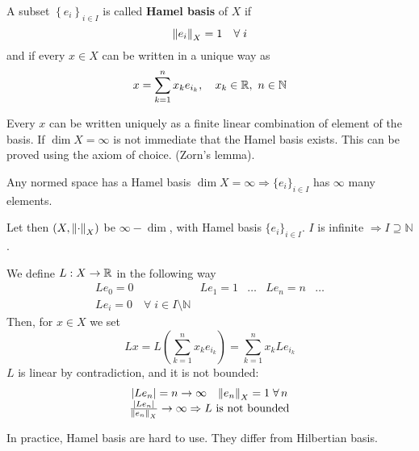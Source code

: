 \begin{definition}
    A subset \(\left\{ e_i \right\}_{i \in I}\) is called \textbf{Hamel basis} of \(X\) if 
    \[
        \norm{e_i}_X = 1 \quad \forall  \; i
    \]
    and if every \(x \in X\) can be written in a unique way as 
    \[
        x = \sum_{k=1}^n x_k e_{i_k}, \quad x_k \in \mathbb{R}, \ n \in \mathbb{N}
    \]
\end{definition}
Every \(x\) can be written uniquely as a finite linear combination of element of the basis.
If \(\dim X = \infty\) is not immediate that the Hamel basis exists. This can be proved using the axiom of choice. (Zorn's lemma). 

Any normed space has a Hamel basis \(\dim X = \infty \Rightarrow \{e_i\}_{i \in I}\) has \(\infty\) many elements.

\noindent Let then \((X, \norm{\cdot}_X)\) be \(\infty -\dim\), with Hamel basis \(\{e_i \}_{i \in I}\). \(I\) is infinite \(\Rightarrow I \supseteq \mathbb{N}\).

\noindent We define \(L:X \to \mathbb{R}\) in the following way 
\[
    \begin{array}{ccccc}
        L e_0 = 0 & L e_1 = 1 & \dots & L e_n = n & \dots \\
        L e_i = 0 \quad \forall \; i \in I \setminus \mathbb{N} &&&&
    \end{array}
\]
Then, for \(x \in X\) we set
\[
    Lx = L \left( \sum_{k=1}^n x_k e_{i_k} \right) = \sum_{k=1}^n x_k L e_{i_k}
\]
\(L\) is linear by contradiction, and it is not bounded:
\[
    \begin{array}{c}
        \abs{L e_n} = n \to \infty \quad \norm{e_n }_X = 1 \; \forall\, n \\
        \frac{\abs{L e_n}}{\norm{e_n}_X} \to \infty \Rightarrow L \text{ is not bounded}
    \end{array}
\]
\begin{remark}
    In practice, Hamel basis are hard to use. They differ from Hilbertian basis.
\end{remark}

